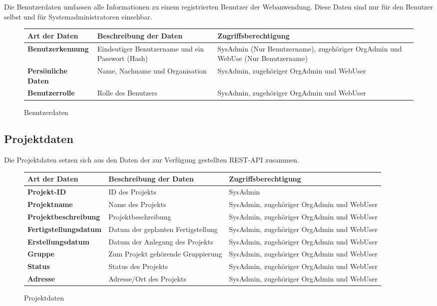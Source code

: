 Die Benutzerdaten umfassen alle Informationen zu einem registrierten Benutzer der Webanwendung. Diese Daten sind nur f\"ur den Benutzer selbst und f\"ur Systemadministratoren einsehbar.

\begin{figure}[h]
	\centering
	\begin{tabularx}{\textwidth}{| X || X | X |}
        \hline
		\textbf{Art der Daten} & \textbf{Beschreibung der Daten} & \textbf{Zugriffsberechtigung} \\ \hline \hline
		\textbf{Benutzerkennung} & Eindeutiger Benutzername und ein Passwort (Hash) & SysAdmin (Nur Benutzername), zugehöriger OrgAdmin und WebUse (Nur Benutzername) \\ \hline
		\textbf{Persönliche Daten} & Name, Nachname und Organisation & SysAdmin, zugehöriger OrgAdmin und WebUser \\ \hline
		\textbf{Benutzerrolle} & Rolle des Benutzers & SysAdmin, zugehöriger OrgAdmin und WebUser \\ \hline
	\end{tabularx}
	\caption{Benutzerdaten}
	\label{fig:Benutzerdaten}
\end{figure}

\newpage

\subsection{Projektdaten}

Die Projektdaten setzen sich aus den Daten der zur Verf\"ugung gestellten REST-API zusammen.

\begin{figure}[h]
	\centering
	\begin{tabularx}{\textwidth}{| X || X | X |}
        \hline
		\textbf{Art der Daten} & \textbf{Beschreibung der Daten} & \textbf{Zugriffsberechtigung} \\ \hline \hline
        \textbf{Projekt-ID} & ID des Projekts & SysAdmin \\ \hline
		\textbf{Projektname} & Name des Projekts & SysAdmin, zugehöriger OrgAdmin und WebUser \\ \hline
		\textbf{Projektbeschreibung} & Projektbeschreibung & SysAdmin, zugehöriger OrgAdmin und WebUser \\ \hline
		\textbf{Fertigstellungsdatum} & Datum der geplanten Fertigstellung & SysAdmin, zugehöriger OrgAdmin und WebUser \\ \hline
        \textbf{Erstellungsdatum} & Datum der Anlegung des Projekts & SysAdmin, zugehöriger OrgAdmin und WebUser \\ \hline
        \textbf{Gruppe} & Zum Projekt gehörende Gruppierung & SysAdmin, zugehöriger OrgAdmin und WebUser \\ \hline
        \textbf{Status} & Status des Projekts & SysAdmin, zugehöriger OrgAdmin und WebUser \\ \hline
        \textbf{Adresse} & Adresse/Ort des Projekts & SysAdmin, zugehöriger OrgAdmin und WebUser \\ \hline
	\end{tabularx}
	\caption{Projektdaten}
	\label{fig:Projektdaten}
\end{figure}


